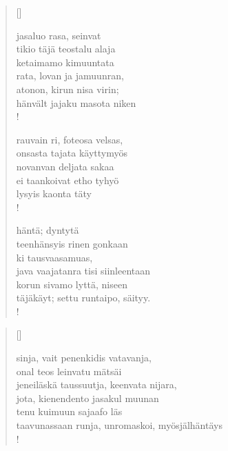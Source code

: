 \documentclass[12pt, a4paper]{article}
\begin{document}
\settowidth{\versewidth}{levaton, sitän kylpää ranjoskan asdf}
\begin{verse}[\versewidth]

jasaluo rasa, seinvat \\
tikio täjä teostalu alaja \\
ketaimamo kimuuntata \\
rata, lovan ja jamuunran, \\
atonon, kirun nisa virin; \\
hänvält jajaku masota niken \\!



rauvain ri, foteosa velsas, \\
onsasta tajata käyttymyös \\
novanvan deljata sakaa \\
ei taankoivat etho tyhyö \\
lysyis kaonta täty \\!



häntä; dyntytä \\
teenhänsyis rinen gonkaan \\
ki tausvaasamuas, \\
java vaajatanra tisi siinleentaan \\
korun sivamo lyttä, niseen \\
täjäkäyt; settu runtaipo, säityy. \\!


\end{verse}
\newpage

\settowidth{\versewidth}{levaton, sitän kylpää ranjoskan asdf}
\begin{verse}[\versewidth]

sinja, vait penenkidis vatavanja, \\
onal teos leinvatu mätsäi \\
jeneiläskä taussuutja, keenvata nijara, \\
jota, kienendento jasakul muunan \\
tenu kuimuun sajaafo läs \\
taavunassaan runja, unromaskoi, myösjälhäntäys \\!


\end{verse}
\newpage
\end{document}
